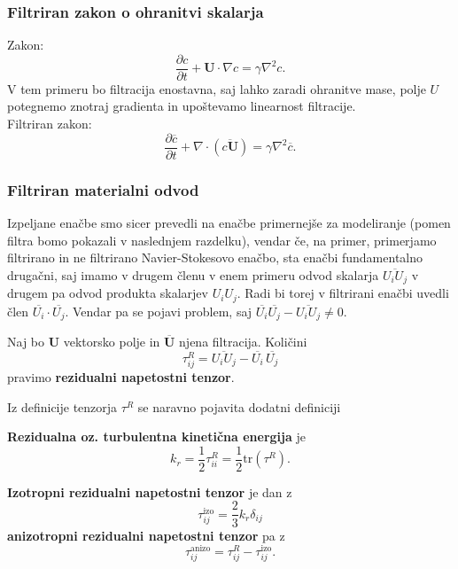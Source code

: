 \documentclass[mat2, tisk]{fmfdelo}
\newcommand{\bd}{\textbf}
\begin{document}
\subsubsection{Filtriran zakon o ohranitvi skalarja}

Zakon:
$$
\frac{\partial c}{\partial t} + \bd{U}\cdot\nabla c = \gamma \nabla^2 c.
$$
V tem primeru bo filtracija enostavna, saj lahko zaradi ohranitve mase, polje $U$ 
potegnemo znotraj gradienta in upoštevamo linearnost filtracije. \\
Filtriran zakon:
\begin{equation}
\frac{\partial \overline{c}}{\partial t} + \nabla \cdot (\overline{c\bd{U}}) = \gamma \nabla^2 \overline{c}.
\end{equation}

\subsubsection{Filtriran materialni odvod}

Izpeljane enačbe smo sicer prevedli na enačbe primernejše za modeliranje (pomen filtra bomo 
pokazali v naslednjem razdelku), vendar če, na primer, primerjamo filtrirano in 
ne filtrirano Navier-Stokesovo enačbo, sta enačbi fundamentalno drugačni, saj imamo 
v drugem členu v enem primeru odvod skalarja $\overline{U_i U_j}$ v drugem pa odvod produkta 
skalarjev $U_i U_j$. Radi bi torej v filtrirani enačbi uvedli člen $\overline{U_i} \cdot \overline{U_j}$.
Vendar pa se pojavi problem, saj $\overline{U_i}\overline{U_j} - \overline{U_i U_j} \neq 0$. 
\begin{definicija}
Naj bo $\bd{U}$ vektorsko polje in $\overline{\bd{U}}$ njena filtracija. Količini 
\begin{equation}
\tau_{ij}^R = \overline{U_i U_j} - \overline{U_i} \,\overline{U_j}
\end{equation}
pravimo \textbf{rezidualni napetostni tenzor}.
\end{definicija}

Iz definicije tenzorja $\tau^R$ se naravno pojavita dodatni definiciji
\begin{definicija}
\bd{Rezidualna oz. turbulentna kinetična energija} je 
\begin{equation}
k_r = \frac{1}{2} \tau_{ii}^R = \frac{1}{2}\text{tr}(\tau^R).
\end{equation}
\end{definicija}

\begin{definicija}
\textbf{Izotropni rezidualni napetostni tenzor} je dan z 
\begin{equation}
\tau_{ij}^\text{izo} = \frac{2}{3} k_r \delta_{ij}
\end{equation}
\textbf{anizotropni rezidualni napetostni tenzor} pa z 
\begin{equation}
\tau_{ij}^\text{anizo} = \tau_{ij}^R - \tau_{ij}^\text{izo}.
\end{equation}
\end{definicija}
\end{document}
